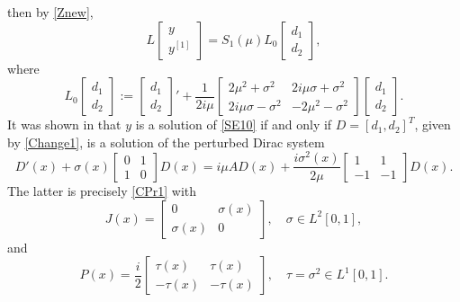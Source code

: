 \documentclass[11pt]{amsart}
\theoremstyle{plain}
\theoremstyle{definition}
\theoremstyle{remark}
\numberwithin{equation}{section}
\begin{document}
then by \eqref{Znew},
\[
L\left[\begin{array} {c}
y \\
y^{[1]}\end{array}
\right]=S_1(\mu)L_0\left[\begin{array} {c}
d_1 \\
d_2\end{array}
\right],
\]
where
\[
L_0\left[\begin{array} {c}
d_1 \\
d_2\end{array}
\right]:=\left[\begin{array} {c}
d_1 \\
d_2\end{array}
\right]'+
\frac{1}{2i\mu}
\left[\begin{array}{cc}
2\mu^2+\sigma^2 & 2i\mu \sigma+\sigma^2\\
2i\mu \sigma-\sigma^2 & -2\mu^2-\sigma^2\end{array}\right]\left[\begin{array} {c}
d_1 \\
d_2\end{array}
\right].
\]
It was shown in \cite{GRZ1} that $y$ is a solution of
\eqref{SE10}
if and only if $D=[d_1,d_2]^T$, given by
\eqref{Change1}, is a solution of the perturbed Dirac system
\begin{equation}\label{CaychyInt0}
D'(x)+\sigma(x)\left[\begin{matrix}
0 & 1\\
1 & 0\end{matrix}\right]D(x)
=i\mu A D(x)+\frac{i\sigma^2(x)}{2\mu}\left[\begin{matrix}
1 & 1\\
-1 & -1\end{matrix}\right]D(x).
\end{equation}
The latter is precisely \eqref{CPr1}
with
\begin{equation*}
J(x)=\left[\begin{array}{cc}
0 &  \sigma(x)\\
\sigma(x) & 0\end{array}\right],\quad \sigma\in L^2[0,1],
\end{equation*}
and
\begin{equation}\label{rfun0}
P(x)=\frac{i}{2}\left[\begin{array}{cc}
\tau(x) &  \tau(x)\\
-\tau(x) & -\tau(x)\end{array}\right],\quad \tau=\sigma^2\in L^1[0,1].
\end{equation}
\end{document}
